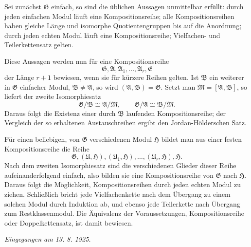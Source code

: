 \documentclass[11pt]{article}
\providecommand{\mM}{\mathfrak{M}}
\providecommand{\mA}{\mathfrak{A}}
\providecommand{\mB}{\mathfrak{B}}
\providecommand{\mE}{\mathfrak{E}}
\providecommand{\mG}{\mathfrak{G}}
\providecommand{\mH}{\mathfrak{H}}
\providecommand{\mU}{\mathfrak{U}}
\begin{document}
Sei zunächst $\mG$ einfach, so sind die üblichen Aussagen unmittelbar erfüllt: durch jeden einfachen Modul läuft eine Kompositionsreihe; alle Kompositionsreihen haben gleiche Länge und isomorphe Quotientengruppen bis auf die Anordnung; durch jeden echten Modul läuft eine Kompositionsreihe; Vielfachen- und Teilerkettensatz gelten.

Diese Aussagen werden nun für eine Kompositionsreihe
\[
        \mG,\mA,\mA_1,\ldots,\mA_r,\mE
\]
der Länge $r+1$ bewiesen, wenn sie für kürzere Reihen gelten. Ist $\mB$ ein weiterer in $\mG$ einfacher Modul, $\mB\ne\mA$, so wird $(\mA,\mB)=\mG$. Setzt man $\mM=[\mA,\mB]$, so liefert der zweite Isomorphiesatz
\[
        \mG/\mB\cong\mA/\mM,
        \qquad
        \mG/\mA\cong\mB/\mM.
\]
Daraus folgt die Existenz einer durch $\mB$ laufenden Kompositionsreihe; der Vergleich der so erhaltenen Austauschreihen ergibt den Jordan-Hölderschen Satz.

Für einen beliebigen, von $\mG$ verschiedenen Modul $\mH$ bildet man aus einer festen Kompositionsreihe die Reihe
\[
        \mG,(\mU,\mH),(\mU_1,\mH),\ldots,(\mU_r,\mH),\mH.
\]
Nach dem zweiten Isomorphiesatz sind die verschiedenen Glieder dieser Reihe aufeinanderfolgend einfach, also bilden sie eine Kompositionsreihe von $\mG$ nach $\mH$. Daraus folgt die Möglichkeit, Kompositionsreihen durch jeden echten Modul zu ziehen. Schließlich bricht jede Vielfachenkette nach dem Übergang zu einem solchen Modul durch Induktion ab, und ebenso jede Teilerkette nach Übergang zum Restklassenmodul. Die Äquivalenz der Voraussetzungen, Kompositionsreihe oder Doppelkettensatz, ist damit bewiesen.

\emph{Eingegangen am 13. 8. 1925.}
\end{document}
